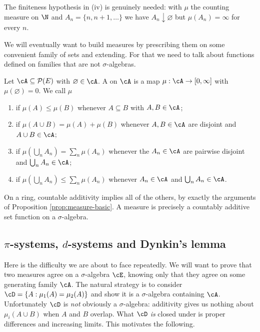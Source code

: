 The finiteness hypothesis in (iv) is genuinely needed: with $\mu$ the counting measure on $\N$ and $A_n = \{n, n+1, \dots\}$ we have $A_n \downarrow \varnothing$ but $\mu(A_n) = \infty$ for every $n$.

We will eventually want to build measures by prescribing them on some convenient family of sets and extending. For that we need to talk about functions defined on families that are not $\sigma$-algebras.

\begin{definition}
	Let $\cA \subseteq \mathcal{P}(E)$ with $\varnothing \in \cA$. A  on $\cA$ is a map $\mu : \cA \to [0,\infty]$ with $\mu(\varnothing) = 0$. We call $\mu$
	\begin{enumerate}[label=(\roman*)]
		\item {} if $\mu(A) \leq \mu(B)$ whenever $A \subseteq B$ with $A, B \in \cA$;
		\item {} if $\mu(A \cup B) = \mu(A) + \mu(B)$ whenever $A, B \in \cA$ are disjoint and $A \cup B \in \cA$;
		\item {} if $\mu(\bigcup_n A_n) = \sum_n \mu(A_n)$ whenever the $A_n \in \cA$ are pairwise disjoint and $\bigcup_n A_n \in \cA$;
		\item {} if $\mu(\bigcup_n A_n) \leq \sum_n \mu(A_n)$ whenever $A_n \in \cA$ and $\bigcup_n A_n \in \cA$.
	\end{enumerate}
\end{definition}

On a ring, countable additivity implies all of the others, by exactly the arguments of Proposition \ref{prop:measure-basic}. A measure is precisely a countably additive set function on a $\sigma$-algebra.

\subsection{\texorpdfstring{$\pi$}{pi}-systems, \texorpdfstring{$d$}{d}-systems and Dynkin's lemma}

Here is the difficulty we are about to face repeatedly. We will want to prove that two measures agree on a $\sigma$-algebra $\cE$, knowing only that they agree on some generating family $\cA$. The natural strategy is to consider $\cD = \{A : \mu_1(A) = \mu_2(A)\}$ and show it is a $\sigma$-algebra containing $\cA$. Unfortunately $\cD$ is \emph{not} obviously a $\sigma$-algebra: additivity gives us nothing about $\mu_i(A \cup B)$ when $A$ and $B$ overlap. What $\cD$ \emph{is} closed under is proper differences and increasing limits. This motivates the following.

